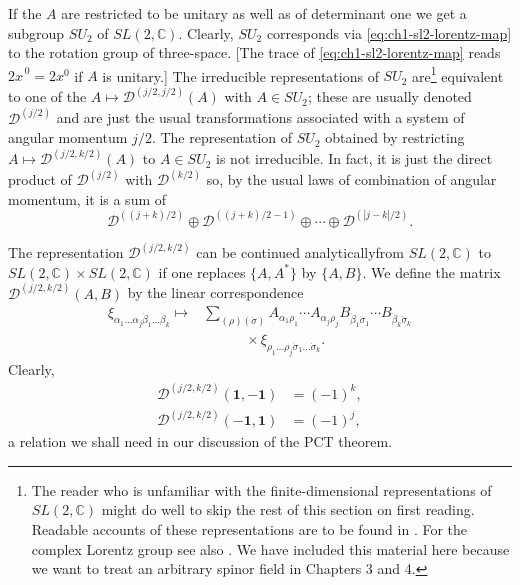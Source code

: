 If the $A$ are restricted to be unitary as well as of determinant one we get a
subgroup $SU_2$ of $SL(2,\mathbb C)$. Clearly, $SU_2$ corresponds via \eqref{eq:ch1-sl2-lorentz-map}
to the rotation group of three-space. [The trace of \eqref{eq:ch1-sl2-lorentz-map} reads
$2\widehat{x}^{\,0}=2x^0$ if $A$ is unitary.] The irreducible
representations of $SU_2$ are\footnote{The reader who is unfamiliar with the finite-dimensional
representations of $SL(2,\mathbb C)$ might do well to skip the rest of this
section on first reading. Readable accounts of these representations are to be
found in \cite{ref:1.9,ref:1.10}. For the complex Lorentz group see also
\cite{ref:1.7}. We
have included this material here because we want to treat an arbitrary spinor
field in Chapters 3 and 4.}
equivalent to one of the
$A\longmapsto\mathcal D^{(j/2,j/2)}(A)$ with $A\in SU_2$; these are usually
denoted $\mathcal D^{(j/2)}$ and are just the usual transformations associated
with a system of angular momentum $j/2$. The representation of $SU_2$
obtained by restricting $A\longmapsto\mathcal D^{(j/2,k/2)}(A)$ to
$A\in SU_2$ is not irreducible. In fact, it is just the direct product of
$\mathcal D^{(j/2)}$ with $\mathcal D^{(k/2)}$ so, by the usual laws of
combination of angular momentum, it is a sum of
\[
  \mathcal D^{((j+k)/2)}
  \oplus\mathcal D^{((j+k)/2-1)}
  \oplus\cdots\oplus
  \mathcal D^{(|j-k|/2)}.
\]

The representation $\mathcal D^{(j/2,k/2)}$ can be continued analytically\linebreak[1]
from $SL(2,\mathbb C)$ to $SL(2,\mathbb C)\times SL(2,\mathbb C)$ if one
replaces $\{A,A^*\}$ by $\{A,B\}$. We define the matrix
$\mathcal D^{(j/2,k/2)}(A,B)$ by the linear correspondence
\[
\begin{aligned}
  \xi_{\alpha_1\ldots\alpha_j\dot\beta_1\ldots\dot\beta_k}
  \longmapsto{}&
  \sum_{(\rho)(\dot\sigma)}
  A_{\alpha_1\rho_1}\cdots A_{\alpha_j\rho_j}
  B_{\dot\beta_1\dot\sigma_1}\cdots
  B_{\dot\beta_k\dot\sigma_k}\\[-2pt]
  &\hspace{3em}\times
  \xi_{\rho_1\ldots\rho_j\dot\sigma_1\ldots\dot\sigma_k}.
\end{aligned}
\]
Clearly,
\begin{equation}
\begin{aligned}
  \mathcal D^{(j/2,k/2)}(\mathbf{1},-\mathbf{1})&=(-1)^k,\\
  \mathcal D^{(j/2,k/2)}(-\mathbf{1},\mathbf{1})&=(-1)^j,
\end{aligned}
\tag{1-27}\label{eq:ch1-sl2-double-cover-signs}
\end{equation}
a relation we shall need in our discussion of the $\mathrm{PCT}$ theorem.

